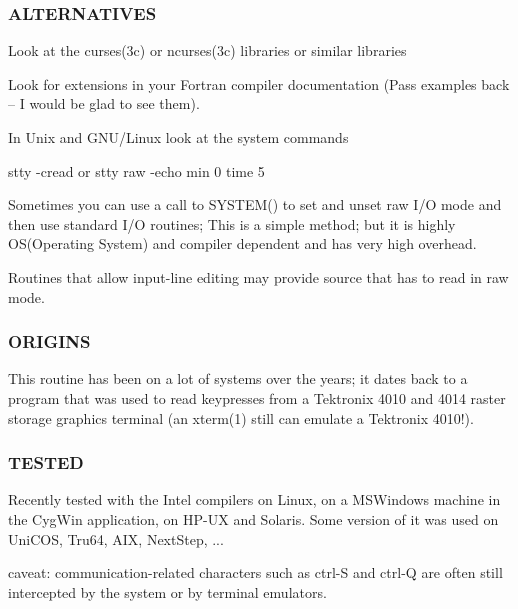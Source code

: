 \subsubsection*{A\+L\+T\+E\+R\+N\+A\+T\+I\+V\+ES}


\begin{DoxyItemize}
\item Look at the curses(3c) or ncurses(3c) libraries or similar libraries
\item Look for extensions in your Fortran compiler documentation (Pass examples back -- I would be glad to see them).
\item In Unix and G\+N\+U/\+Linux look at the system commands

stty -\/cread or stty raw -\/echo min 0 time 5
\end{DoxyItemize}

\begin{DoxyVerb} Sometimes you can use a call to SYSTEM() to set and unset raw I/O
 mode and then use standard I/O routines; This is a simple method;
 but it is highly OS(Operating System) and compiler dependent and
 has very high overhead.
\end{DoxyVerb}

\begin{DoxyItemize}
\item Routines that allow input-\/line editing may provide source that has to read in raw mode.
\end{DoxyItemize}

\subsubsection*{O\+R\+I\+G\+I\+NS}

\begin{DoxyVerb}This routine has been on a lot of systems over the years; it dates back
to a program that was used to read keypresses from a Tektronix 4010 and
4014 raster storage graphics terminal (an xterm(1) still can emulate a
Tektronix 4010!).
\end{DoxyVerb}


\subsubsection*{T\+E\+S\+T\+ED}

\begin{DoxyVerb}Recently tested with the Intel compilers on Linux, on a MSWindows
machine in the CygWin application, on HP-UX and Solaris. Some version
of it was used on UniCOS, Tru64, AIX, NextStep, ...

caveat: communication-related characters such as ctrl-S and ctrl-Q
are often still intercepted by the system or by terminal emulators. \end{DoxyVerb}
 